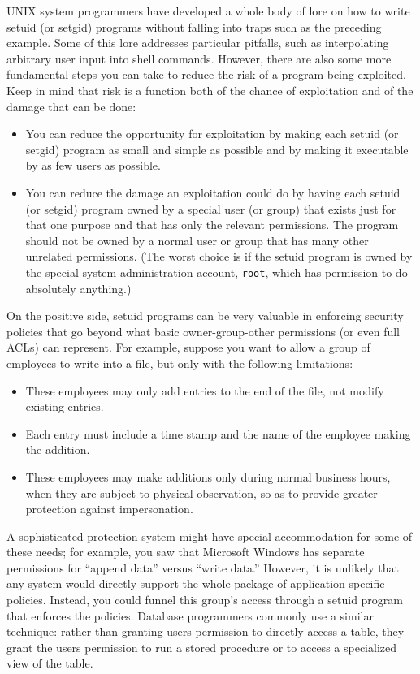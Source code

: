 UNIX system programmers have developed a whole body of lore on how to
write setuid (or setgid) programs without falling into traps such as
the preceding example.  Some of this lore addresses particular pitfalls,
such as interpolating arbitrary user input into shell commands.
However, there are also some more fundamental steps you can take to
reduce the risk of a program being exploited.  Keep in mind that risk
is a function both of the chance of exploitation and of the damage
that can be done:
\begin{itemize}
\item
You can reduce the opportunity for exploitation by making each setuid
(or setgid) program as small and simple as possible and by making it
executable by as few users as possible.
\item
You can reduce the damage an exploitation could do by having each
setuid (or setgid) program owned by a special user (or group) that
exists just for that one purpose and that has only the relevant
permissions.  The program should not be owned by a normal user or group that has many other
unrelated permissions.  (The worst choice is if the setuid program is
owned by the special system administration account, {\tt root}, which
has permission to do absolutely anything.)
\end{itemize}

On the positive side, setuid programs can be very valuable in
enforcing security policies that go beyond what basic
owner-group-other permissions (or even full ACLs) can represent.  For
example, suppose you want to allow a group of employees to write into
a file, but only with the following limitations:
\begin{itemize}
\item
These employees may only add entries to the end of the file, not
modify existing entries.
\item
Each entry must include a time stamp and the name of the employee
making the addition.
\item
These employees may make additions only during normal business hours,
when they are subject to physical observation, so as to provide
greater protection against impersonation.
\end{itemize}
A sophisticated protection system might have special accommodation for
some of these needs; for example, you saw that Microsoft Windows has
separate permissions for ``append data'' versus ``write data.''
However, it is unlikely that any system would directly support the
whole package of application-specific policies.  Instead, you could
funnel this group's access through a setuid program that enforces the
policies.  Database programmers commonly use a similar technique:
rather than granting users permission to directly access a table, they
grant the users permission to run a stored procedure or to access a
specialized view of the table.

